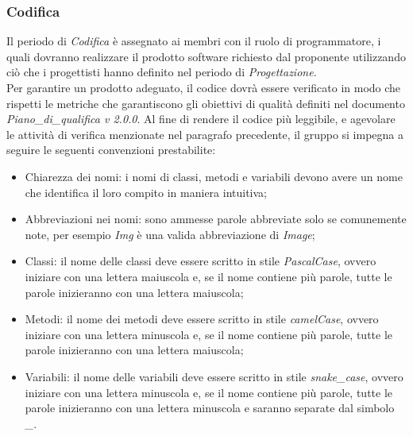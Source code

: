 	\subsubsection{Codifica}
	Il periodo di \textit{Codifica} è assegnato ai membri con il ruolo di programmatore, i quali dovranno realizzare il prodotto software richiesto dal proponente utilizzando ciò che i progettisti hanno definito nel periodo di \textit{Progettazione}.\\
	Per garantire un prodotto adeguato, il codice dovrà essere verificato in modo che rispetti le metriche che garantiscono gli obiettivi di qualità definiti nel documento \textit{Piano\_di\_qualifica v 2.0.0}.
	Al fine di rendere il codice più leggibile, e agevolare le attività di verifica menzionate nel paragrafo precedente, il gruppo si impegna a seguire le seguenti convenzioni prestabilite:
    \begin{itemize}
        \item Chiarezza dei nomi: i nomi di classi, metodi e variabili devono avere un nome che identifica il loro compito in maniera intuitiva;
        \item Abbreviazioni nei nomi: sono ammesse parole abbreviate solo se comunemente note, per esempio \textit{Img} è una valida abbreviazione di \textit{Image};
		\item Classi: il nome delle classi deve essere scritto in stile \textit{PascalCase}, ovvero iniziare con una lettera maiuscola e, se il nome contiene più parole, tutte le parole inizieranno con una lettera maiuscola;
		\item Metodi: il nome dei metodi deve essere scritto in stile \textit{camelCase}, ovvero iniziare con una lettera minuscola e, se il nome contiene più parole, tutte le parole inizieranno con una lettera maiuscola;
		\item Variabili: il nome delle variabili deve essere scritto in stile \textit{snake\_case}, ovvero iniziare con una lettera minuscola e, se il nome contiene più parole, tutte le parole inizieranno con una lettera minuscola e saranno separate dal simbolo \textit{\_}.
    \end{itemize}
    
